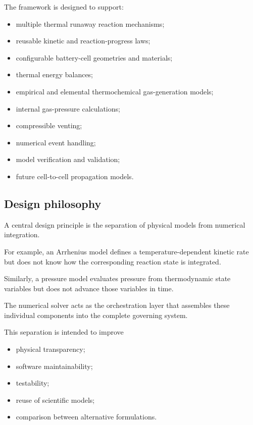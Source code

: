 The framework is designed to support:

\begin{itemize}
    \item multiple thermal runaway reaction mechanisms;
    \item reusable kinetic and reaction-progress laws;
    \item configurable battery-cell geometries and materials;
    \item thermal energy balances;
    \item empirical and elemental thermochemical gas-generation models;
    \item internal gas-pressure calculations;
    \item compressible venting;
    \item numerical event handling;
    \item model verification and validation;
    \item future cell-to-cell propagation models.
\end{itemize}


\subsection{Design philosophy}

A central design principle is the separation of physical models from
numerical integration.

For example, an Arrhenius model defines a temperature-dependent kinetic
rate but does not know how the corresponding reaction state is
integrated.

Similarly, a pressure model evaluates pressure from thermodynamic state
variables but does not advance those variables in time.

The numerical solver acts as the orchestration layer that assembles these
individual components into the complete governing system.

This separation is intended to improve

\begin{itemize}
    \item physical transparency;
    \item software maintainability;
    \item testability;
    \item reuse of scientific models;
    \item comparison between alternative formulations.
\end{itemize}


